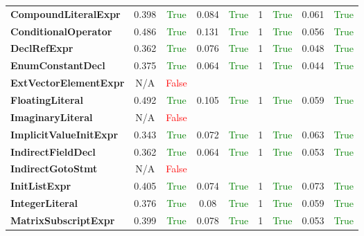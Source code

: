 \documentclass{article}
\begin{document}
\begin{xltabular}{\textwidth}{lcccccccc}
\textbf{{\fontsize{10}{12}\selectfont CompoundLiteralExpr}}& 0.398&\textcolor{green}{True}& 0.084&\textcolor{green}{True}& 1&\textcolor{green}{True}& 0.061&\textcolor{green}{True} \\[0.5ex]
\textbf{{\fontsize{10}{12}\selectfont ConditionalOperator}}& 0.486&\textcolor{green}{True}& 0.131&\textcolor{green}{True}& 1&\textcolor{green}{True}& 0.056&\textcolor{green}{True} \\[0.5ex]
\textbf{{\fontsize{10}{12}\selectfont DeclRefExpr}}& 0.362&\textcolor{green}{True}& 0.076&\textcolor{green}{True}& 1&\textcolor{green}{True}& 0.048&\textcolor{green}{True} \\[0.5ex]
\textbf{{\fontsize{10}{12}\selectfont EnumConstantDecl}}& 0.375&\textcolor{green}{True}& 0.064&\textcolor{green}{True}& 1&\textcolor{green}{True}& 0.044&\textcolor{green}{True} \\[0.5ex]
\textbf{{\fontsize{10}{12}\selectfont ExtVectorElementExpr}}& N/A&\textcolor{red}{False} \\[0.5ex]
\textbf{{\fontsize{10}{12}\selectfont FloatingLiteral}}& 0.492&\textcolor{green}{True}& 0.105&\textcolor{green}{True}& 1&\textcolor{green}{True}& 0.059&\textcolor{green}{True} \\[0.5ex]
\textbf{{\fontsize{10}{12}\selectfont ImaginaryLiteral}}& N/A&\textcolor{red}{False} \\[0.5ex]
\textbf{{\fontsize{10}{12}\selectfont ImplicitValueInitExpr}}& 0.343&\textcolor{green}{True}& 0.072&\textcolor{green}{True}& 1&\textcolor{green}{True}& 0.063&\textcolor{green}{True} \\[0.5ex]
\textbf{{\fontsize{10}{12}\selectfont IndirectFieldDecl}}& 0.362&\textcolor{green}{True}& 0.064&\textcolor{green}{True}& 1&\textcolor{green}{True}& 0.053&\textcolor{green}{True} \\[0.5ex]
\textbf{{\fontsize{10}{12}\selectfont IndirectGotoStmt}}& N/A&\textcolor{red}{False} \\[0.5ex]
\textbf{{\fontsize{10}{12}\selectfont InitListExpr}}& 0.405&\textcolor{green}{True}& 0.074&\textcolor{green}{True}& 1&\textcolor{green}{True}& 0.073&\textcolor{green}{True} \\[0.5ex]
\textbf{{\fontsize{10}{12}\selectfont IntegerLiteral}}& 0.376&\textcolor{green}{True}& 0.08&\textcolor{green}{True}& 1&\textcolor{green}{True}& 0.059&\textcolor{green}{True} \\[0.5ex]
\textbf{{\fontsize{10}{12}\selectfont MatrixSubscriptExpr}}& 0.399&\textcolor{green}{True}& 0.078&\textcolor{green}{True}& 1&\textcolor{green}{True}& 0.053&\textcolor{green}{True} \\[0.5ex]

\end{xltabular}
\end{document}
